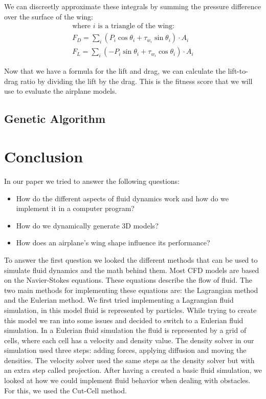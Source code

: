\documentclass[a4paper,12pt,titlepage]{article}
\begin{document}
We can discreetly approximate these integrals by summing the pressure difference
over the surface of the wing:
\[
	\begin{array}{l}
		\text{where $i$ is a triangle of the wing:} \\
		F_D = \sum\limits_i (P_i \cos \theta_i + \tau_{w_i} \sin \theta_i) \cdot A_i \\
		F_L = \sum\limits_i (-P_i \sin \theta_i + \tau_{w_i} \cos \theta_i) \cdot A_i
	\end{array}
\]

Now that we have a formula for the lift and drag, we can calculate the lift-to-drag
ratio by dividing the lift by the drag. This is the fitness score that we will
use to evaluate the airplane models.

\subsection{Genetic Algorithm}
\ipsum[1]

\pagebreak
\section{Conclusion}
In our paper we tried to answer the following questions: 

\begin{itemize}
	\item{How do the different aspects of fluid dynamics work and how do we implement it in a computer program?}
	\item{How do we dynamically generate 3D models?}
	\item{How does an airplane's wing shape influence its performance?}
\end{itemize}

To answer the first question we looked the different methods that can be used to simulate fluid dynamics and the math behind them.
Most CFD models are based on the Navier-Stokes equations. These equations describe the flow of fluid. 
The two main methods for implementing these equations are: the Lagrangian method and the Eulerian method. 
We first tried implementing a Lagrangian fluid simulation, in this model fluid is represented by particles.
While trying to create this model we ran into some issues and decided to switch to a Eulerian fluid simulation.
In a Eulerian fluid simulation the fluid is represented by a grid of cells, where each cell has a velocity and density value.
The density solver in our simulation used three steps: adding forces, applying diffusion and moving the densities.
The velocity solver used the same steps as the density solver but with an extra step called projection.
After having a created a basic fluid simulation, we looked at how we could implement fluid behavior when dealing with obstacles. 
For this, we used the Cut-Cell method. 
\end{document}

